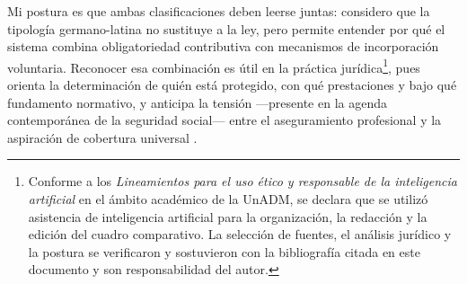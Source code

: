 \documentclass[12pt,letterpaper,oneside]{article}
\begin{document}
Mi postura es que ambas clasificaciones deben leerse juntas: considero que la tipología germano-latina no sustituye a la ley, pero permite entender por qué el sistema combina obligatoriedad contributiva con mecanismos de incorporación voluntaria. Reconocer esa combinación es útil en la práctica jurídica\footnote{Conforme a los \textit{Lineamientos para el uso ético y responsable de la inteligencia artificial} en el ámbito académico de la UnADM, se declara que se utilizó asistencia de inteligencia artificial para la organización, la redacción y la edición del cuadro comparativo. La selección de fuentes, el análisis jurídico y la postura se verificaron y sostuvieron con la bibliografía citada en este documento y son responsabilidad del autor.}, pues orienta la determinación de quién está protegido, con qué prestaciones y bajo qué fundamento normativo, y anticipa la tensión —presente en la agenda contemporánea de la seguridad social— entre el aseguramiento profesional y la aspiración de cobertura universal \citep{gonzalezCarvallo2024,moralesFajardo2021}.

\clearpage
\nocite{cpeum2026,lss2026,lissste2026,lissfam2026,bricenoRuiz2011,gonzalezCarvallo2024,ibarraOlguin2022,cotonietoMartinez2021,moralesFajardo2021,acnudhSeguridadSocial2026,normasApaReferencias2020}

\end{document}
